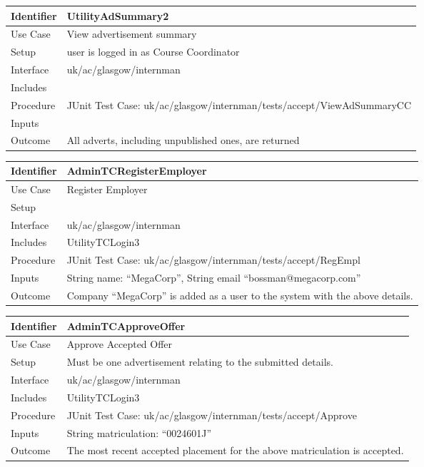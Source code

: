 \vspace{2em}

\begin{tabularx}{\textwidth}{|T|L|}
\hline
Identifier & UtilityAdSummary2\\
\hline
Use Case & View advertisement summary\\
\hline
Setup & user is logged in as Course Coordinator\\
\hline
Interface & uk/ac/glasgow/internman\\
\hline
Includes &\\
\hline
Procedure & JUnit Test Case: uk/ac/glasgow/internman/tests/accept/ViewAdSummaryCC\\
\hline
Inputs &\\
\hline
Outcome & All adverts, including unpublished ones, are returned\\
\hline
\end{tabularx}

\vspace{2em}

\vspace{2em}
\begin{tabularx}{\textwidth}{|T|L|}
\hline
Identifier & AdminTCRegisterEmployer\\
\hline
Use Case & Register Employer\\
\hline
Setup & \\
\hline
Interface & uk/ac/glasgow/internman\\
\hline
Includes & UtilityTCLogin3\\
\hline
Procedure & JUnit Test Case: uk/ac/glasgow/internman/tests/accept/RegEmpl\\
\hline
Inputs & String name: ``MegaCorp'', String email ``bossman@megacorp.com''\\
\hline
Outcome & Company ``MegaCorp'' is added as a user to the system with
the above details.\\
\hline
\end{tabularx}

\vspace{2em}

\begin{tabularx}{\textwidth}{|T|L|}
\hline
Identifier & AdminTCApproveOffer\\
\hline
Use Case & Approve Accepted Offer\\
\hline
Setup & Must be one advertisement relating to the submitted details.\\
\hline
Interface & uk/ac/glasgow/internman\\
\hline
Includes & UtilityTCLogin3\\
\hline
Procedure & JUnit Test Case: uk/ac/glasgow/internman/tests/accept/Approve\\
\hline
Inputs & String matriculation: ``0024601J''\\
\hline
Outcome & The most recent accepted placement for the above
matriculation is accepted.\\
\hline
\end{tabularx}

